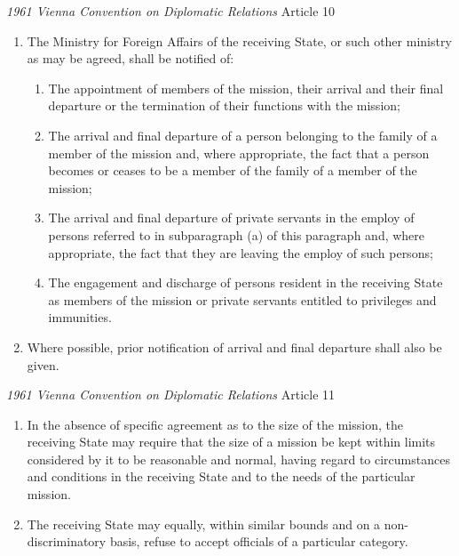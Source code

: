 \begin{conventiondetails}{\textit{1961 Vienna Convention on Diplomatic Relations} Article 10}
    \flushleft
    \begin{enumerate}
        \item The Ministry for Foreign Affairs of the receiving State, or such other ministry as may be agreed, shall be notified of:
        \begin{enumerate}
            \item The appointment of members of the mission, their arrival and their final departure or the termination of their functions with the mission;
            \item The arrival and final departure of a person belonging to the family of a member of the mission and, where appropriate, the fact that a person becomes or ceases to be a member of the family of a member of the mission;
            \item The arrival and final departure of private servants in the employ of persons referred to in subparagraph (a) of this paragraph and, where appropriate, the fact that they are leaving the employ of such persons;
            \item The engagement and discharge of persons resident in the receiving State as members of the mission or private servants entitled to privileges and immunities.
        \end{enumerate}
        \item Where possible, prior notification of arrival and final departure shall also be given.
    \end{enumerate}
\end{conventiondetails}

\begin{conventiondetails}{\textit{1961 Vienna Convention on Diplomatic Relations} Article 11}
    \flushleft
    \begin{enumerate}
        \item In the absence of specific agreement as to the size of the mission, the receiving State may require that the size of a mission be kept within limits considered by it to be reasonable and normal, having regard to circumstances and conditions in the receiving State and to the needs of the particular mission.
        \item The receiving State may equally, within similar bounds and on a non-discriminatory basis, refuse to accept officials of a particular category.
    \end{enumerate}
\end{conventiondetails}

